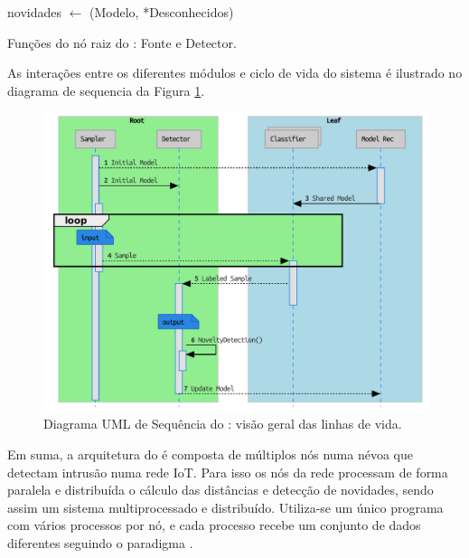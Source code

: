 \begin{algorithm}[htb]
{{{{                    novidades $\leftarrow$ \NoveltyDetection(Modelo, *Desconhecidos)\;
                }
            }
        }
    }
\caption{Funções do nó raiz do \mfog: Fonte e Detector.}
\label{alg:MFOG-root}
\end{algorithm}

As interações entre os diferentes módulos e ciclo de vida do sistema é ilustrado
no diagrama de sequencia da Figura \ref{fig:mfog-mpi-life}.

\begin{figure}[htb]
  \centerline{
    \includegraphics[width=0.75\linewidth,page=1]{figures/lifecycle-uml-svg.pdf}
  }
  \caption{Diagrama UML de Sequência do \mfog: visão geral das linhas de vida.}
  \label{fig:mfog-mpi-life}
\end{figure}

Em suma, a arquitetura do \mfog é composta de múltiplos nós numa névoa que detectam
intrusão numa rede IoT. Para isso os nós da rede processam de forma paralela e
distribuída o cálculo das distâncias e detecção de novidades, sendo assim um
sistema multiprocessado e distribuído. Utiliza-se um único programa com vários
processos por nó, e cada processo recebe um conjunto de dados diferentes
seguindo o paradigma \spmd.
